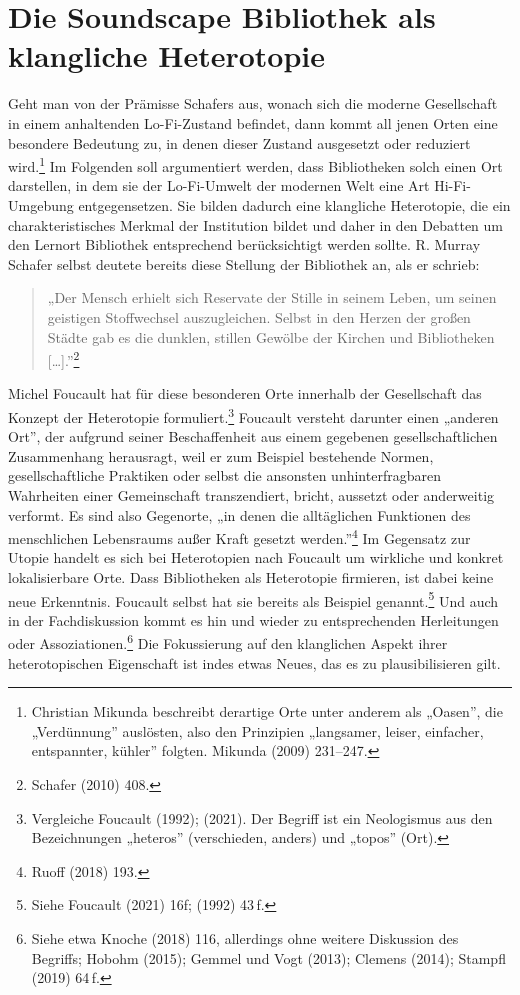 \documentclass[a4paper,
fontsize=11pt,
oneside,
numbers=noperiodatend,
parskip=half-,
bibliography=totoc,
final
]{scrartcl}
\begin{document}
\hypertarget{die-soundscape-bibliothek-als-klangliche-heterotopie}{%
\section{Die Soundscape Bibliothek als klangliche
Heterotopie}\label{die-soundscape-bibliothek-als-klangliche-heterotopie}}

Geht man von der Prämisse Schafers aus, wonach sich die moderne
Gesellschaft in einem anhaltenden Lo-Fi-Zustand befindet, dann kommt all
jenen Orten eine besondere Bedeutung zu, in denen dieser Zustand
ausgesetzt oder reduziert wird.\footnote{Christian Mikunda beschreibt
  derartige Orte unter anderem als „Oasen'', die „Verdünnung''
  auslösten, also den Prinzipien „langsamer, leiser, einfacher,
  entspannter, kühler'' folgten. Mikunda (2009) 231--247.} Im Folgenden
soll argumentiert werden, dass Bibliotheken solch einen Ort darstellen,
in dem sie der Lo-Fi-Umwelt der modernen Welt eine Art Hi-Fi-Umgebung
entgegensetzen. Sie bilden dadurch eine klangliche Heterotopie, die ein
charakteristisches Merkmal der Institution bildet und daher in den
Debatten um den Lernort Bibliothek entsprechend berücksichtigt werden
sollte. R. Murray Schafer selbst deutete bereits diese Stellung der
Bibliothek an, als er schrieb:

\begin{quote}
„Der Mensch erhielt sich Reservate der Stille in seinem Leben, um seinen
geistigen Stoffwechsel auszugleichen. Selbst in den Herzen der großen
Städte gab es die dunklen, stillen Gewölbe der Kirchen und Bibliotheken
{[}\ldots{]}.''\footnote{Schafer (2010) 408.}
\end{quote}

Michel Foucault hat für diese besonderen Orte innerhalb der Gesellschaft
das Konzept der Heterotopie formuliert.\footnote{Vergleiche Foucault
  (1992); (2021). Der Begriff ist ein Neologismus aus den Bezeichnungen
  „heteros'' (verschieden, anders) und „topos'' (Ort).} Foucault
versteht darunter einen „anderen Ort'', der aufgrund seiner
Beschaffenheit aus einem gegebenen gesellschaftlichen Zusammenhang
herausragt, weil er zum Beispiel bestehende Normen, gesellschaftliche
Praktiken oder selbst die ansonsten unhinterfragbaren Wahrheiten einer
Gemeinschaft transzendiert, bricht, aussetzt oder anderweitig verformt.
Es sind also Gegenorte, „in denen die alltäglichen Funktionen des
menschlichen Lebensraums außer Kraft gesetzt werden.''\footnote{Ruoff
  (2018) 193.} Im Gegensatz zur Utopie handelt es sich bei Heterotopien
nach Foucault um wirkliche und konkret lokalisierbare Orte. Dass
Bibliotheken als Heterotopie firmieren, ist dabei keine neue Erkenntnis.
Foucault selbst hat sie bereits als Beispiel genannt.\footnote{Siehe
  Foucault (2021) 16f; (1992) 43\,f.} Und auch in der Fachdiskussion
kommt es hin und wieder zu entsprechenden Herleitungen oder
Assoziationen.\footnote{Siehe etwa Knoche (2018) 116, allerdings ohne
  weitere Diskussion des Begriffs; Hobohm (2015); Gemmel und Vogt
  (2013); Clemens (2014); Stampfl (2019) 64\,f.} Die Fokussierung auf
den klanglichen Aspekt ihrer heterotopischen Eigenschaft ist indes etwas
Neues, das es zu plausibilisieren gilt.
\end{document}

